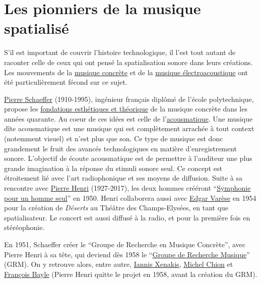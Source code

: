 \documentclass[
  letterpaper,
  DIV=11,
  numbers=noendperiod]{scrreprt}
\begin{document}
\hypertarget{les-pionniers-de-la-musique-spatialisuxe9}{%
\section{Les pionniers de la musique
spatialisé}\label{les-pionniers-de-la-musique-spatialisuxe9}}

S'il est important de couvrir l'histoire technologique, il l'est tout
autant de raconter celle de ceux qui ont pensé la spatialisation sonore
dans leurs créations. Les mouvements de la
\href{https://fr.m.wikipedia.org/wiki/Musique_concr\%C3\%A8te}{musique
concrète} et de la
\href{https://fr.m.wikipedia.org/wiki/Musique_\%C3\%A9lectroacoustique}{musique
électroacoustique} ont été particulièrement fécond sur ce sujet.

\href{https://fr.m.wikipedia.org/wiki/Pierre_Schaeffer}{Pierre
Schaeffer} (1910-1995), ingénieur français diplômé de l'école
polytechnique, propose les
\href{http://archive.olats.org/pionniers/pp/schaeffer/theorieSchaeffer.php}{fondations
esthétiques et théorique} de la musique concrète dans les années
quarante. Au coeur de ces idées est celle de
l'\href{http://www.musiques-recherches.be/musiques-recherches/presentation}{acousmatique}.
Une musique dîte acousmatique est une musique qui est complètement
arrachée à tout context (notemment visuel) et n'est plus que son. Ce
type de musique est donc grandement le fruit des avancés technologiques
en matière d'enregistrement sonore. L'objectif de écoute acousmatique
est de permettre à l'auditeur une plus grande imagination à la réponse
du stimuli sonore seul. Ce concept est étroitement lié avec l'art
radiophonique et ses moyens de diffusion. Suite à sa rencontre avec
\href{https://fr.wikipedia.org/wiki/Pierre_Henry}{Pierre Henri}
(1927-2017), les deux hommes crééront
``\href{https://fr.m.wikipedia.org/wiki/Symphonie_pour_un_homme_seul}{Symphonie
pour un homme seul}'' en 1950. Henri collaborera aussi avec
\href{https://fr.wikipedia.org/wiki/Edgard_Var\%C3\%A8se}{Edgar Varèse}
en 1954 pour la création de \emph{Déserts} au Théâtre des
Champs-Elysées, en tant que spatialisateur. Le concert est aussi diffusé
à la radio, et pour la première fois en stéréophonie.

En 1951, Schaeffer créer le ``Groupe de Recherche en Musique Concrète'',
avec Pierre Henri à sa tête, qui deviend dès 1958 le
``\href{https://fr.m.wikipedia.org/wiki/Groupe_de_recherches_musicales}{Groupe
de Recherche Musique}'' (GRM). On y retrouve alors, entre autre,
\href{https://fr.m.wikipedia.org/wiki/Iannis_Xenakis}{Iannis Xenakis},
\href{https://fr.m.wikipedia.org/wiki/Michel_Chion}{Michel Chion} et
\href{https://fr.m.wikipedia.org/wiki/Fran\%C3\%A7ois_Bayle}{François
Bayle} (Pierre Henri quitte le projet en 1958, avant la création du
GRM).
\end{document}
